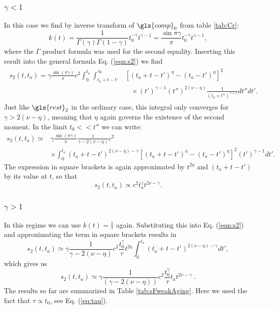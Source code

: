 \subsubsection{$\gamma<1$}
In this case we find by inverse transform of $\gls{comp}_0$ from table \ref{tab:Cr}:
\begin{equation}
 k(t) = \frac{1}{\Gamma(\gamma) \Gamma(1-\gamma)} t_0^{-\gamma} t^{\gamma-1} = \frac{\sin \pi \gamma}{\pi} t_0^{-\gamma} t^{\gamma-1} \label{eqn:kGammaSmall},
\end{equation}
%
where the $\Gamma$ product formula was used for the second equality. Inserting this result into the general formula Eq. (\ref{eqn:s2}) we find
\begin{align}
\begin{split}
s_2(t,t_a) = \gamma\frac{\sin(\pi \gamma)}{\pi}  c^2  \int_0^{t_a} \int^{\infty}_{t_a+t-t'} & [(t_a+t-t')^\eta-(t_a-t')^{\eta}]^2 \\
& \;\;\; \times   (t')^{\gamma-1}  (t'')^{2(\nu-\eta)} \frac{1}{(t_0+t'')^{\gamma+1}} dt'' dt' .
\end{split}
\end{align}
%
Just like $\gls{rest}_2$ in the ordinary case, this integral only converges for $\gamma>2(\nu-\eta)$, meaning that $\eta$ again governs the existence of the second moment. In the limit $t_0<< t''$ we can write:
\begin{align}
s_2(t,t_a) \simeq &  \gamma\frac{\sin(\pi \gamma)}{\pi} \frac{ 1 }{\gamma-2(\nu-\eta)} c^2 \\
&   \times \int_0^{t_a} (t_a+t-t')^{2(\nu-\eta)-\gamma} [(t_a+t-t')^\eta-(t_a-t')^{\eta}]^2 (t')^{\gamma-1}  dt' \nonumber .
\end{align}
The expression in square brackets is again approximated by $t^{2\eta}$ and $(t_a+t-t')$ by its value at $t$, so that
\begin{equation}
 s_2(t,t_a) \propto c^2 t_a^\gamma t^{2\nu -\gamma}. 
\end{equation}

\subsubsection{$\gamma>1$}
In this regime we can use $k(t)=\frac{1}{\tau}$ again. Substituting this into Eq. (\ref{eqn:s2}) and  approximating the term in square brackets results in
%
\begin{equation}
s_2(t,t_a) \simeq \gamma \frac{1}{\gamma-2(\nu-\eta)}c^2 \frac{t_0^{\gamma}}{\tau} t^{2\eta} \int_{0}^{t_a} (t_a+t-t')^{2(\nu-\eta)-\gamma} dt'  ,
\end{equation}
%
which gives us
%
\begin{equation}
s_2(t,t_a) \simeq \gamma \frac{1}{(\gamma-2(\nu-\eta))} c^2\frac{t_0^{\gamma}}{\tau} t_a t^{2\nu-\gamma} \; .
\end{equation}
The results so far are summarized in Table \ref{tab:sFweakAging}. Here we used the fact that $\tau \propto t_0$, see Eq. (\ref{eq:tau}). 

